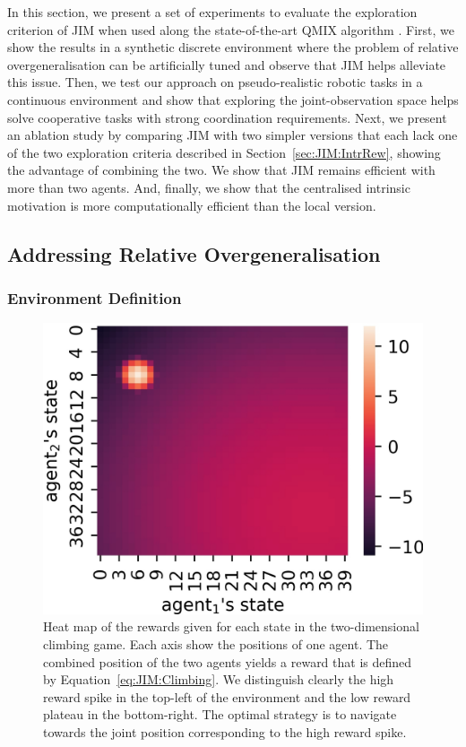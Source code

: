 In this section, we present a set of experiments to evaluate the exploration criterion of JIM when used along the state-of-the-art QMIX algorithm \citep{Rashid2018_QMIX}. First, we show the results in a synthetic discrete environment where the problem of relative overgeneralisation can be artificially tuned and observe that JIM helps alleviate this issue. Then, we test our approach on pseudo-realistic robotic tasks in a continuous environment and show that exploring the joint-observation space helps solve cooperative tasks with strong coordination requirements. Next, we present an ablation study by comparing JIM with two simpler versions that each lack one of the two exploration criteria described in Section~\ref{sec:JIM:IntrRew}, showing the advantage of combining the two. We show that JIM remains efficient with more than two agents. And, finally, we show that the centralised intrinsic motivation is more computationally efficient than the local version. 

\subsection{Addressing Relative Overgeneralisation}
\label{sec:JIM:Exp_Climbing}

\subsubsection{Environment Definition}

\begin{figure}
    \centering
    \includegraphics[width=0.5\linewidth]{Figures/JIM/ro_map30.jpg}
    \caption{Heat map of the rewards given for each state in the two-dimensional climbing game. Each axis show the positions of one agent. The combined position of the two agents yields a reward that is defined by Equation~\ref{eq:JIM:Climbing}. We distinguish clearly the high reward spike in the top-left of the environment and the low reward plateau in the bottom-right. The optimal strategy is to navigate towards the joint position corresponding to the high reward spike.}
    \label{fig:JIM:ro_map}
\end{figure}


